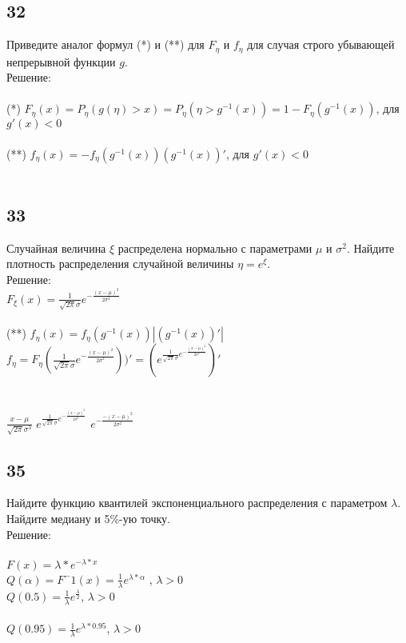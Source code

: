 \documentclass[a4paper, 12pt]{extarticle}
\numberwithin{figure}{section}
\begin{document}
\subsection*{32}
Приведите аналог формул (*) и (**) для $F_\eta$ и $f_\eta$ для случая строго убывающей непрерывной функции $g$.\\

Решение:\\
\\
(*) $F_\eta(x) = P_\eta(g(\eta)>x)=P_\eta(\eta>g^{-1}(x)) = 1 - F_\eta(g^{-1}(x))$, для $g'(x) < 0$\\
\\
(**) $f_\eta(x) = - f_\eta(g^{-1}(x))(g^{-1}(x))'$, для $g'(x) < 0$\\
\\


\subsection*{33}
Случайная величина $\xi$ распределена нормально с параметрами $\mu$ и $\sigma^2$. Найдите плотность распределения случайной величины $\eta = e^\xi$.\\

Решение:\\

$F_\xi(x) = \frac{1}{\sqrt{2\pi}\sigma}e^{-\frac{(x-\mu)^2}{2\sigma^2}}$\\
\\
(**) $f_\eta(x) = f_\eta(g^{-1}(x))|(g^{-1}(x))'|$\\

$f_\eta = F_\eta(\frac{1}{\sqrt{2\pi}\sigma}e^{-\frac{(x-\mu)^2}{2\sigma^2}}))' = (e^{\frac{1}{\sqrt{2\pi}\sigma}e^{-\frac{(x-\mu)^2}{2\sigma^2}}})'$\\
\\
\\
$\frac{x-\mu}{\sqrt{2\pi}\sigma^3}$
$e^{\frac{1}{\sqrt{2\pi}\sigma}e^{-\frac{(x-\mu)^2}{2\sigma^2}}}$
$e^{-\frac{-(x-\mu)^2}{2\sigma^2}}$
\\


\subsection*{35}
Найдите функцию квантилей экспоненциального распределения с параметром $\lambda$.\\
Найдите медиану и 5\%-ую точку.\\

Решение:\\
\\
$F(x)=\lambda*e^{-\lambda*x}$\\
$Q(\alpha) = F^-1(x) = \frac{1}{\lambda}e^{\lambda*\alpha}$ , $\lambda>0$\\
$Q(0.5) = \frac{1}{\lambda}e^\frac{\lambda}{2}$, $\lambda>0$\\
\\
$Q(0.95) = \frac{1}{\lambda}e^{\lambda*0.95}$, $\lambda>0$\\
\end{document}
